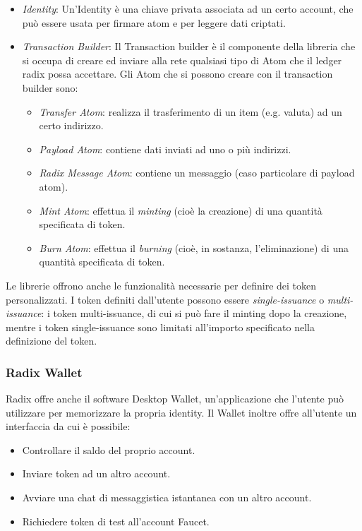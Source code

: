 \begin{itemize}
    \item \textit{Identity}: Un'Identity è una chiave privata associata ad un certo account, che può essere usata per firmare atom e per leggere dati criptati.
    \item \textit{Transaction Builder}: Il Transaction builder è il componente della libreria che si occupa di creare ed inviare alla rete qualsiasi tipo di Atom che il ledger radix possa accettare. Gli Atom che si possono creare con il transaction builder sono:
    \begin{itemize}
        \item \textit{Transfer Atom}: realizza il trasferimento di un item (e.g. valuta) ad un certo indirizzo.
        \item \textit{Payload Atom}: contiene dati inviati ad uno o più indirizzi.
        \item \textit{Radix Message Atom}: contiene un messaggio (caso particolare di payload atom).
        \item \textit{Mint Atom}: effettua il \textit{minting} (cioè la creazione) di una quantità specificata di token.
        \item \textit{Burn Atom}: effettua il \textit{burning} (cioè, in sostanza, l'eliminazione) di una quantità specificata di token.
    \end{itemize}
\end{itemize}
Le librerie offrono anche le funzionalità necessarie per definire dei token personalizzati. I token definiti dall'utente possono essere \textit{single-issuance} o \textit{multi-issuance}: i token multi-issuance, di cui si può fare il minting dopo la creazione, mentre i token single-issuance sono limitati all'importo specificato nella definizione del token.

\subsubsection{Radix Wallet}

Radix offre anche il software Desktop Wallet, un'applicazione che l'utente può utilizzare per memorizzare la propria identity. Il Wallet inoltre offre all'utente un interfaccia da cui è possibile: 
\begin{itemize}
    \item Controllare il saldo del proprio account.
    \item Inviare token ad un altro account.
    \item Avviare una chat di messaggistica istantanea con un altro account.
    \item Richiedere token di test all'account Faucet.
\end{itemize}